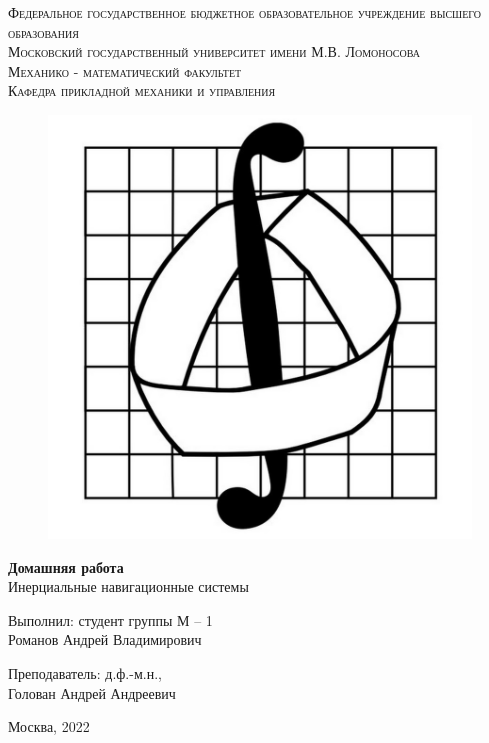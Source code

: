 \documentclass[a4paper,14pt]{article}
\theoremstyle{plain} %
\theoremstyle{definition} %
\theoremstyle{remark} %
\begin{document}
\begin{center}
    {\textsc{Федеральное государственное бюджетное образовательное
            учреждение высшего образования
        }}\\
    {\textsc{Московский государственный университет имени М.В. Ломоносова
    }} \\
    \vspace{0.2cm}
    {\textsc{Механико - математический факультет}}\\
    \vspace{0.2cm}
    {\textsc{Кафедра прикладной механики и управления}}\\
    \hfill \break
    \begin{figure}[h!]
        \centering
        \includegraphics[width=0.30\linewidth]{emblema}
        \label{fig:emblema}
    \end{figure}
    \hfill \break
    \hfill \break
    \large{\textbf{Домашняя работа}\\
        \hfill \break Инерциальные навигационные системы
    }
\end{center}

\hfill \break
\hfill \break
\begin{flushright}
    {
        Выполнил: студент группы М -- 1 \\ Романов Андрей Владимирович}
\end{flushright}

\begin{flushright}
    {
        Преподаватель: д.ф.-м.н., \\ Голован Андрей Андреевич}
\end{flushright}
\hfill \break
\hfill \break
\begin{center} {Москва, 2022} \end{center}
\end{document}
